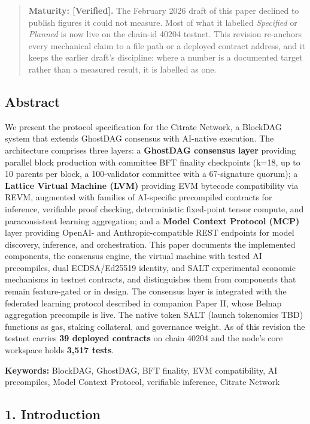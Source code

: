 \begin{quote}
\textbf{Maturity: {[}Verified{]}.} The February 2026 draft of this paper
declined to publish figures it could not measure. Most of what it
labelled \emph{Specified} or \emph{Planned} is now live on the chain-id
40204 testnet. This revision re-anchors every mechanical claim to a file
path or a deployed contract address, and it keeps the earlier draft's
discipline: where a number is a documented target rather than a measured
result, it is labelled as one.
\end{quote}

\subsection{Abstract}\label{abstract}

We present the protocol specification for the Citrate Network, a
BlockDAG system that extends GhostDAG consensus with AI-native
execution. The architecture comprises three layers: a \textbf{GhostDAG
consensus layer} providing parallel block production with committee BFT
finality checkpoints (k=18, up to 10 parents per block, a 100-validator
committee with a 67-signature quorum); a \textbf{Lattice Virtual Machine
(LVM)} providing EVM bytecode compatibility via REVM, augmented with
families of AI-specific precompiled contracts for inference, verifiable
proof checking, deterministic fixed-point tensor compute, and
paraconsistent learning aggregation; and a \textbf{Model Context
Protocol (MCP)} layer providing OpenAI- and Anthropic-compatible REST
endpoints for model discovery, inference, and orchestration. This paper
documents the implemented components, the consensus engine, the virtual
machine with tested AI precompiles, dual ECDSA/Ed25519 identity, and
SALT experimental economic mechanisms in testnet contracts, and distinguishes them
from components that remain feature-gated or in design. The consensus
layer is integrated with the federated learning protocol described in
companion Paper II, whose Belnap aggregation precompile is live. The
native token SALT (launch tokenomics TBD) functions as gas, staking
collateral, and governance weight. As of this revision the testnet
carries \textbf{39 deployed contracts} on chain 40204 and the node's
core workspace holds \textbf{3,517 tests}.

\textbf{Keywords:} BlockDAG, GhostDAG, BFT finality, EVM compatibility,
AI precompiles, Model Context Protocol, verifiable inference, Citrate
Network

\subsection{1. Introduction}\label{introduction}

